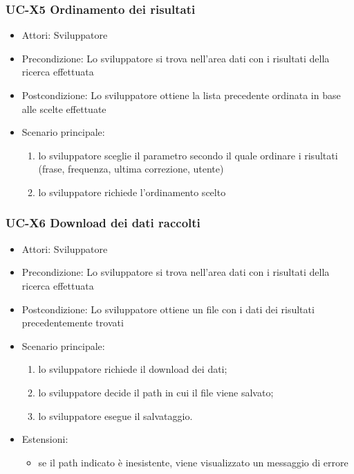 	\subsubsection{UC-X5 Ordinamento dei risultati}
		\begin{itemize}
			\item Attori: Sviluppatore
			\item Precondizione: Lo sviluppatore si trova nell'area dati con i risultati della ricerca effettuata
			\item Postcondizione: Lo sviluppatore ottiene la lista precedente ordinata in base alle scelte effettuate
			\item Scenario principale:
				\begin{enumerate}
					\item lo sviluppatore sceglie il parametro secondo il quale ordinare i risultati (frase, frequenza, ultima correzione, utente)
					\item lo sviluppatore richiede l'ordinamento scelto
				\end{enumerate}
		\end{itemize} 
	
	\subsubsection{UC-X6 Download dei dati raccolti}
		\begin{itemize}
			\item Attori: Sviluppatore
			\item Precondizione: Lo sviluppatore si trova nell'area dati con i risultati della ricerca effettuata
			\item Postcondizione: Lo sviluppatore ottiene un file con i dati dei risultati precedentemente trovati
			\item Scenario principale:
				\begin{enumerate}
					\item lo sviluppatore richiede il download dei dati;
					\item lo sviluppatore decide il path in cui il file viene salvato;
					\item lo sviluppatore esegue il salvataggio.
				\end{enumerate}
			\item Estensioni:
				\begin{itemize}
					\item se il path indicato è inesistente, viene visualizzato un messaggio di errore
				\end{itemize}
		\end{itemize} 


